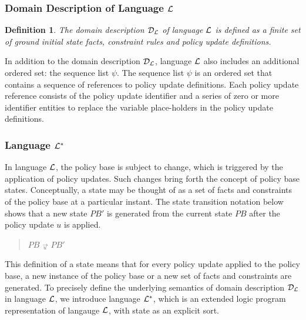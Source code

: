 \documentclass[10pt, twocolumn]{article}
\newtheorem{definition}{Definition}
\begin{document}
      \subsubsection{Domain Description of Language ${\cal L}$}

        \begin{definition}
          The domain description ${\cal D}_{\cal L}$ of language ${\cal L}$ is
          defined as a finite set of ground initial state facts, constraint
          rules and policy update definitions.
        \end{definition}

        In addition to the domain description ${\cal D}_{\cal L}$, language
        ${\cal L}$ also includes an additional ordered set: the sequence list
        $\psi$. The sequence list $\psi$ is an ordered set that contains a
        sequence of references to policy update definitions. Each policy update
        reference consists of the policy update identifier and a series of zero
        or more identifier entities to replace the variable place-holders in
        the policy update definitions.

      \subsubsection{Language ${\cal L}^{*}$}

        In language ${\cal L}$, the policy base is subject to change, which is
        triggered by the application of policy updates. Such changes bring
        forth the concept of policy base states. Conceptually, a state may be
        thought of as a set of facts and constraints of the policy base at a
        particular instant. The state transition notation below shows that a
        new state $PB'$ is generated from the current state $PB$ after the
        policy update $u$ is applied.

        \begin{quote}
          $PB$ $\overrightarrow{_{u}}$ $PB'$
        \end{quote}

        This definition of a state means that for every policy update applied
        to the policy base, a new instance of the policy base or a new set of
        facts and constraints are generated. To precisely define the underlying
        semantics of domain description ${\cal D}_{\cal L}$ in language
        ${\cal L}$, we introduce language ${\cal L}^{*}$, which is an extended
        logic program representation of langauge ${\cal L}$, with state as an
        explicit sort.
\end{document}
